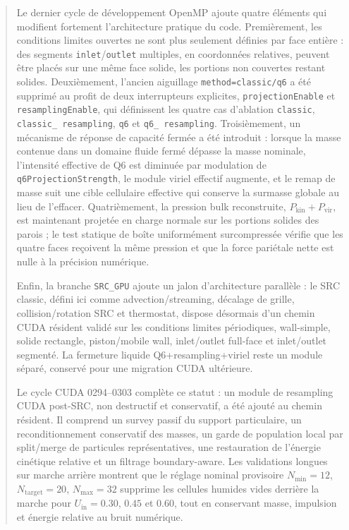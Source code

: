 \documentclass[11pt,a4paper]{article}
\begin{document}
\begin{abstract}
Le dernier cycle de développement OpenMP ajoute quatre éléments qui modifient fortement l'architecture pratique du code. Premièrement, les conditions limites ouvertes ne sont plus seulement définies par face entière : des segments \texttt{inlet}/\texttt{outlet} multiples, en coordonnées relatives, peuvent être placés sur une même face solide, les portions non couvertes restant solides. Deuxièmement, l'ancien aiguillage \texttt{method=classic/q6} a été supprimé au profit de deux interrupteurs explicites, \texttt{projectionEnable} et \texttt{resamplingEnable}, qui définissent les quatre cas d'ablation \texttt{classic}, \texttt{classic\_ resampling}, \texttt{q6} et \texttt{q6\_ resampling}. Troisièmement, un mécanisme de réponse de capacité fermée a été introduit : lorsque la masse contenue dans un domaine fluide fermé dépasse la masse nominale, l'intensité effective de Q6 est diminuée par modulation de \texttt{q6ProjectionStrength}, le module viriel effectif augmente, et le remap de masse suit une cible cellulaire effective qui conserve la surmasse globale au lieu de l'effacer. Quatrièmement, la pression bulk reconstruite, $P_{\mathrm{kin}}+P_{\mathrm{vir}}$, est maintenant projetée en charge normale sur les portions solides des parois ; le test statique de boîte uniformément surcompressée vérifie que les quatre faces reçoivent la même pression et que la force pariétale nette est nulle à la précision numérique.

Enfin, la branche \texttt{SRC\_GPU} ajoute un jalon d'architecture parallèle : le SRC classic, défini ici comme advection/streaming, décalage de grille, collision/rotation SRC et thermostat, dispose désormais d'un chemin CUDA résident validé sur les conditions limites périodiques, wall-simple, solide rectangle, piston/mobile wall, inlet/outlet full-face et inlet/outlet segmenté. La fermeture liquide Q6+resampling+viriel reste un module séparé, conservé pour une migration CUDA ultérieure.



Le cycle CUDA 0294--0303 complète ce statut : un module de resampling CUDA post-SRC, non destructif et conservatif, a été ajouté au chemin résident. Il comprend un survey passif du support particulaire, un reconditionnement conservatif des masses, un garde de population local par split/merge de particules représentatives, une restauration de l'énergie cinétique relative et un filtrage boundary-aware. Les validations longues sur marche arrière montrent que le réglage nominal provisoire $N_{\min}=12$, $N_{\mathrm{target}}=20$, $N_{\mathrm{max}}=32$ supprime les cellules humides vides derrière la marche pour $U_{\mathrm{in}}=0.30$, $0.45$ et $0.60$, tout en conservant masse, impulsion et énergie relative au bruit numérique.




\end{abstract}
\end{document}

